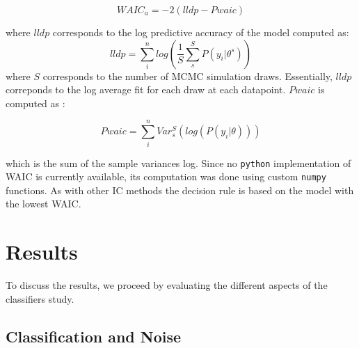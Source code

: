 \documentclass[12pt,]{article}
\begin{document}
\begin{equation}
WAIC_a = -2(lldp - Pwaic)
\end{equation}

where \(lldp\) corresponds to the log predictive accuracy of the model computed as:
\begin{equation}
lldp = \sum_i^n log(\frac{1}{S}\sum_s^SP(y_i|\theta^s))
\end{equation}
where \(S\) corresponds to the number of MCMC simulation draws. Essentially, \(lldp\) correponds to the log average fit for each draw at each datapoint. \(Pwaic\) is computed as :

\begin{equation}
Pwaic = \sum_i^nVar_s^S(log(P(y_i|\theta)))
\end{equation}

which is the sum of the sample variances log. Since no \texttt{python} implementation of WAIC is currently available, its computation was done using custom \texttt{numpy} functions. As with other IC methods the decision rule is based on the model with the lowest WAIC.

\hypertarget{result}{%
\section{Results}\label{result}}

To discuss the results, we proceed by evaluating the different aspects of the classifiers study.

\hypertarget{classification-and-noise}{%
\subsection{Classification and Noise}\label{classification-and-noise}}
\end{document}
